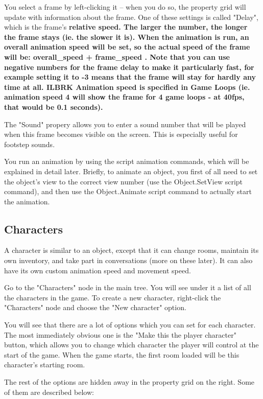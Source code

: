 You select a frame by left-clicking it -- when you do so, the property grid
will update with information about the frame. One of these settings is
called "Delay", which is the frame's \bf{relative} speed. The larger the number,
the longer the frame stays (ie. the slower it is). When the animation is run,
an overall animation speed will be set, so the actual speed of the frame
will be:  overall_speed + frame_speed  . Note that you can use negative
numbers for the frame delay to make it particularly fast, for example setting
it to -3 means that the frame will stay for hardly any time at all. ILBRK
Animation speed is specified in Game Loops (ie. animation speed 4 will show the
frame for 4 game loops - at 40fps, that would be 0.1 seconds).

The "Sound" propery allows you to enter a sound number that will be played
when this frame becomes visible on the screen.
This is especially useful for footstep sounds.

You run an animation by using the script animation commands, which will
be explained in detail later. Briefly, to animate an object, you first
of all need to set the object's view to the correct view number (use
the Object.SetView script command), and then use the Object.Animate
script command to actually start the animation.

\subsection{Characters}%

A character is similar to an object, except that it can change rooms,
maintain its own inventory, and take part in conversations (more on
these later). It can also have its own custom animation speed and movement
speed.

Go to the "Characters" node in the main tree. You will see under it a
list of all the characters in the game.
To create a new character, right-click the "Characters" node and
choose the "New character" option.

You will see that there are a lot of options which you can set for each
character. The most immediately obvious one is the "Make this the player character"
button, which allows you to change which character the player will control
at the start of the game.
When the game starts, the first room loaded will be this character's
starting room.

The rest of the options are hidden away in the property grid on the right. Some
of them are described below:

